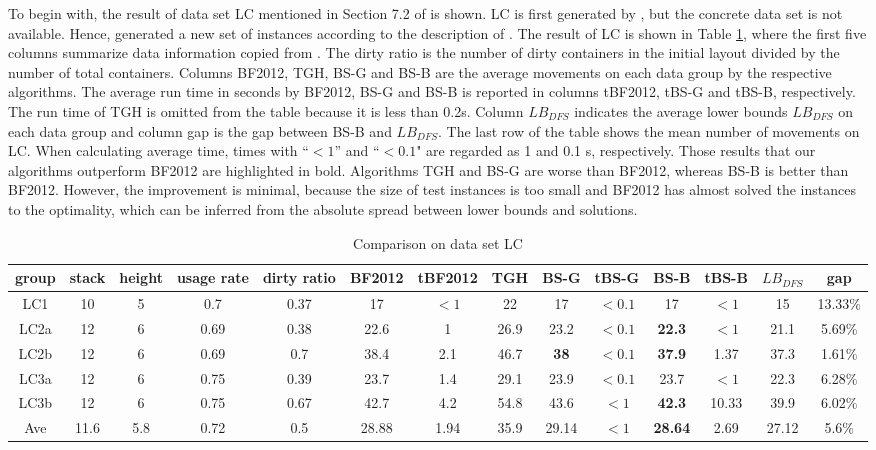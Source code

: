\documentclass[review,3p,times,authoryear,12pt]{elsarticle}
\begin{document}
To begin with, the result of data set LC mentioned in Section 7.2 of \cite{BF2012} is shown.
LC is first generated by \cite{Lee2009}, but the concrete data set is not available.
Hence, \cite{BF2012} generated a new set of instances according to the description of \cite{Lee2009}.
The result of LC is shown in Table \ref{tab:lc}, where the first five columns summarize data information copied from \cite{BF2012}.
The dirty ratio is the number of dirty containers in the initial layout divided by the number of total containers.
Columns BF2012, TGH, BS-G and BS-B are the average movements on each data group by the respective algorithms.
The average run time in seconds by BF2012, BS-G and BS-B is reported in columns tBF2012, tBS-G and tBS-B, respectively.
The run time of TGH is omitted from the table because it is less than 0.2s.
Column $\mathit{LB}_\mathit{DFS}$ indicates the average lower bounds $\mathit{LB}_\mathit{DFS}$ on each data group and column gap is the gap between BS-B and $\mathit{LB}_\mathit{DFS}$.
The last row of the table shows the mean number of movements on LC.
When calculating average time, times with ``$<1$''  and ``$<0.1$" are regarded as 1 and 0.1 s, respectively.
Those results that our algorithms outperform BF2012 are highlighted in bold.
Algorithms TGH and BS-G are worse than BF2012, whereas BS-B is better than BF2012.
However, the improvement is minimal, because the size of test instances is too small and BF2012 has almost solved the instances to the optimality, which can be inferred from the absolute spread between lower bounds and solutions.

\begin{table}[!htb]
\scriptsize
\centering
  \caption{\label{tab:lc} Comparison on data set LC}
    \begin{tabular}{c|c|c|c|c|c|c|c|c|c|c|c|c|c}

    \hline
    group & stack & height & usage rate & dirty ratio & BF2012 & tBF2012 & TGH   & BS-G  & tBS-G & BS-B  & tBS-B & $\mathit{LB}_\mathit{DFS}$ & gap\\
    \hline
    LC1   & 10   & 5  & 0.7  & 0.37 & 17   & $<1$ & 22   & 17         & $<0.1$ & 17             & $<1$  & 15 & 13.33\%\\
    LC2a  & 12   & 6  & 0.69 & 0.38 & 22.6 & 1    & 26.9 & 23.2       & $<0.1$ & \textbf{22.3}  & $<1$  & 21.1 & 5.69\%\\
    LC2b  & 12   & 6  & 0.69 & 0.7  & 38.4 & 2.1  & 46.7 & \textbf{38}& $<0.1$ & \textbf{37.9}  & 1.37  & 37.3 & 1.61\%\\
    LC3a  & 12   & 6  & 0.75 & 0.39 & 23.7 & 1.4  & 29.1 & 23.9       & $<0.1$ & 23.7           & $<1$  & 22.3 & 6.28\%\\
    LC3b  & 12   & 6  & 0.75 & 0.67 & 42.7 & 4.2  & 54.8 & 43.6       & $<1$   & \textbf{42.3}  & 10.33 & 39.9 & 6.02\%\\
    \hline
    Ave   & 11.6 & 5.8& 0.72 & 0.5  & 28.88& 1.94 & 35.9 & 29.14      & $<1$   & \textbf{28.64} & 2.69  & 27.12&
    5.6\% \\
    \hline
    \end{tabular}%
\end{table}%
\end{document}
